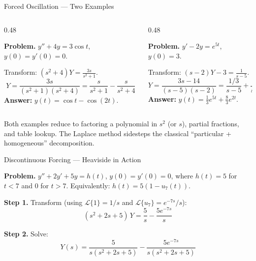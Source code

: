 \documentclass[aspectratio=169,11pt]{beamer}
\begin{document}
\begin{frame}{Forced Oscillation --- Two Examples}
\footnotesize
\begin{columns}[T]
\begin{column}{0.48\textwidth}
\begin{examplebox}
\textbf{Problem.} $y'' + 4y = 3\cos t$, $y(0)=y'(0)=0$.

Transform: $(s^2+4)Y = \frac{3s}{s^2+1}$.
\[Y = \frac{3s}{(s^2+1)(s^2+4)} = \frac{s}{s^2+1} - \frac{s}{s^2+4}\]
\textbf{Answer:} $y(t) = \cos t - \cos(2t)$.
\end{examplebox}
\end{column}
\begin{column}{0.48\textwidth}
\begin{examplebox}
\textbf{Problem.} $y' - 2y = e^{5t}$, $y(0)=3$.

Transform: $(s-2)Y - 3 = \frac{1}{s-5}$.
\[Y = \frac{3s-14}{(s-5)(s-2)} = \frac{1/3}{s-5} + \frac{8/3}{s-2}\]
\textbf{Answer:} $y(t) = \tfrac{1}{3}e^{5t} + \tfrac{8}{3}e^{2t}$.
\end{examplebox}
\end{column}
\end{columns}
\vspace{1mm}
\begin{conceptbox}
Both examples reduce to factoring a polynomial in $s^2$ (or $s$), partial fractions, and table lookup. The Laplace method sidesteps the classical ``particular + homogeneous'' decomposition.
\end{conceptbox}
\end{frame}

\begin{frame}{Discontinuous Forcing --- Heaviside in Action}
\footnotesize
\begin{examplebox}[A Mass-Spring Switched Off at $t=7$]
\textbf{Problem.} $y'' + 2y' + 5y = h(t)$, $y(0)=y'(0)=0$, where $h(t) = 5$ for $t < 7$ and $0$ for $t > 7$. Equivalently: $h(t) = 5(1 - u_7(t))$.

\textbf{Step 1.} Transform (using $\mathcal{L}\{1\} = 1/s$ and $\mathcal{L}\{u_7\} = e^{-7s}/s$):
\[(s^2 + 2s + 5)\,Y = \frac{5}{s} - \frac{5e^{-7s}}{s}\]

\textbf{Step 2.} Solve:
\[Y(s) = \frac{5}{s(s^2+2s+5)} - \frac{5e^{-7s}}{s(s^2+2s+5)}\]
\end{examplebox}
\end{frame}
\end{document}
